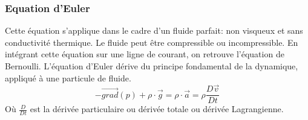 \documentclass[10pt,a4paper]{article}
\begin{document}
\subsubsection{Equation d'Euler\cite{eqeuler}}
Cette équation s'applique dans le cadre d'un fluide parfait: non visqueux et sans conductivité thermique. Le fluide peut être compressible ou incompressible. En intégrant cette équation sur une ligne de courant, on retrouve l'équation de Bernoulli. L'équation d'Euler dérive du principe fondamental de la dynamique, appliqué à une particule de fluide.
\begin{equation}
-\overrightarrow{grad}(p) + \rho\cdot\overrightarrow{g} = \rho\cdot\overrightarrow{a} = \rho\frac{D\overrightarrow{v}}{Dt}
\end{equation}
Où $\frac{D }{Dt}$ est la dérivée particulaire ou dérivée totale ou dérivée Lagrangienne.



\newpage


\end{document}
